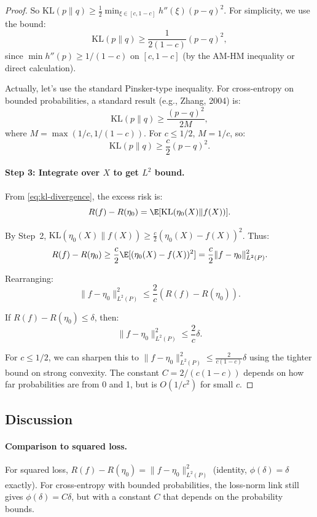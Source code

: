 \begin{proof}
So $\text{KL}(p \| q) \ge \frac{1}{2} \min_{\xi \in [c,1-c]} h''(\xi) (p-q)^2$. For simplicity, we use the bound:
\[
\text{KL}(p \| q) \ge \frac{1}{2(1-c)} (p-q)^2,
\]
since $\min h''(p) \ge 1/(1-c)$ on $[c, 1-c]$ (by the AM-HM inequality or direct calculation).

Actually, let's use the standard Pinsker-type inequality. For cross-entropy on bounded probabilities, a standard result (e.g., Zhang, 2004) is:
\[
\text{KL}(p \| q) \ge \frac{(p - q)^2}{2 M},
\]
where $M = \max(1/c, 1/(1-c))$. For $c \le 1/2$, $M = 1/c$, so:
\[
\text{KL}(p \| q) \ge \frac{c}{2} (p - q)^2.
\]

\paragraph{Step 3: Integrate over $X$ to get $L^2$ bound.}

From \eqref{eq:kl-divergence}, the excess risk is:
\[
R(f) - R(\eta_0) = \E[\text{KL}(\eta_0(X) \| f(X))].
\]

By Step~2, $\text{KL}(\eta_0(X) \| f(X)) \ge \frac{c}{2} (\eta_0(X) - f(X))^2$. Thus:
\[
R(f) - R(\eta_0) \ge \frac{c}{2} \E[(\eta_0(X) - f(X))^2] = \frac{c}{2} \|f - \eta_0\|_{L^2(P)}^2.
\]

Rearranging:
\[
\|f - \eta_0\|_{L^2(P)}^2 \le \frac{2}{c} (R(f) - R(\eta_0)).
\]

If $R(f) - R(\eta_0) \le \delta$, then:
\[
\|f - \eta_0\|_{L^2(P)}^2 \le \frac{2}{c} \delta.
\]

For $c \le 1/2$, we can sharpen this to $\|f - \eta_0\|_{L^2(P)}^2 \le \frac{2}{c(1-c)} \delta$ using the tighter bound on strong convexity. The constant $C = 2/(c(1-c))$ depends on how far probabilities are from 0 and 1, but is $O(1/c^2)$ for small $c$.
\end{proof}

\subsection{Discussion}

\paragraph{Comparison to squared loss.}
For squared loss, $R(f) - R(\eta_0) = \|f - \eta_0\|_{L^2(P)}^2$ (identity, $\phi(\delta) = \delta$ exactly). For cross-entropy with bounded probabilities, the loss-norm link still gives $\phi(\delta) = C\delta$, but with a constant $C$ that depends on the probability bounds.

